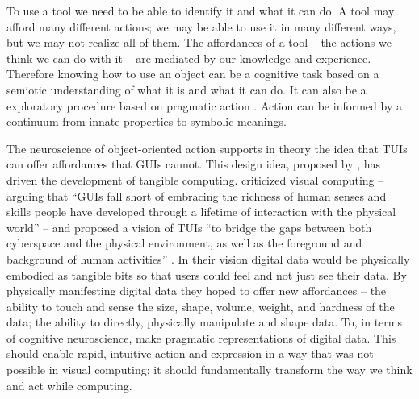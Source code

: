 \documentclass{article}
\begin{document}
To use a tool we need to be able to identify it and what it can do. 
A tool may afford many different actions; we may be able to use it in many different ways, but we may not realize all of them. 
The affordances of a tool -- the actions we think we can do with it \citep{gibson1977} -- are mediated by our knowledge and experience.
Therefore knowing how to use an object can be a cognitive task based on a semiotic understanding of what it is and what it can do. 
It can also be a exploratory procedure based on pragmatic action \citep{Jeannerod1997}. Action can be informed by a continuum from innate properties to symbolic meanings. 

The neuroscience of object-oriented action supports in theory the idea that TUIs can offer affordances that GUIs cannot.
This design idea, proposed by \citet{Ishii1997}, has driven the development of tangible computing.
\citeauthor{Ishii1997} criticized visual computing -- arguing that ``GUIs fall short of embracing the richness of human senses and skills people have developed through a lifetime of interaction with the physical world'' -- and proposed a vision of TUIs ``to bridge the gaps between both cyberspace and the physical environment, as well as the foreground and background of human activities'' \citeyearpar{Ishii1997}.  
In their vision digital data would be physically embodied as tangible bits so that users could feel and not just see their data. 
By physically manifesting digital data they hoped to offer new affordances -- the ability to touch and sense the size, shape, volume, weight, and hardness of the data;
the ability to directly, physically manipulate and shape data. 
To, in terms of cognitive neuroscience, make pragmatic representations of digital data. 
This should enable rapid, intuitive action and expression in a way that was not possible in visual computing;   
it should fundamentally transform the way we think and act while computing.


\end{document}
